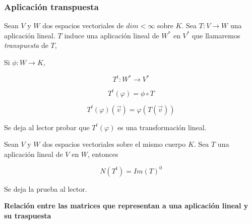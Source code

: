 



\bigskip

\subsubsection{Aplicación transpuesta}

\noindent
Sean $V$ y $W$ dos espacios vectoriales de  $dim<\infty$ sobre $K$. 
Sea $T: V \rightarrow W$ una aplicación lineal. $T$ induce una aplicación lineal  de $W^*$ en $V^*$ que llamaremos \textit{transpuesta }de $T$, 

Si $\phi: W \rightarrow K$,

\bigskip

$$T^t: W^* \rightarrow V^*$$

$$T^t(\varphi)=\phi \circ T$$

$$T^t(\varphi)(\vec v)=\varphi(T(\vec v))$$

\bigskip

Se deja al lector probar que $T^t(\varphi)$ es una transformación lineal.

\bigskip


\begin{theorem}

Sean $V$ y $W$ dos espacios vectoriales sobre el mismo cuerpo $K$. Sea $T$ una aplicación lineal de $V$ en $W$, entonces

$$N(T^t)=Im(T)^0$$

\bigskip
Se deja la prueba al lector.





\end{theorem}

\bigskip



\textbf{Relación entre las matrices que representan a una aplicación lineal y su traspuesta}

